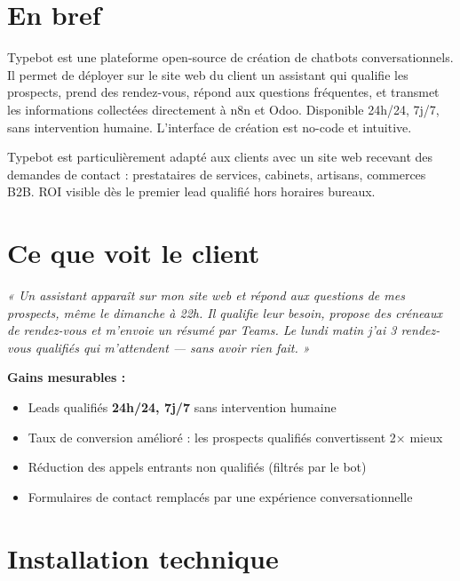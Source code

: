 \documentclass[11pt, a4paper]{article}
\begin{document}
\ficheHeader

\section*{En bref}
Typebot est une plateforme open-source de création de chatbots conversationnels. Il permet de déployer sur le site web du client un assistant qui qualifie les prospects, prend des rendez-vous, répond aux questions fréquentes, et transmet les informations collectées directement à n8n et Odoo. Disponible 24h/24, 7j/7, sans intervention humaine. L'interface de création est no-code et intuitive.

\begin{pointcle}
  Typebot est particulièrement adapté aux clients avec un site web recevant des demandes de contact : prestataires de services, cabinets, artisans, commerces B2B. ROI visible dès le premier lead qualifié hors horaires bureaux.
\end{pointcle}

\section{Ce que voit le client}

\begin{clientbox}
  \textit{« Un assistant apparaît sur mon site web et répond aux questions de mes prospects, même le dimanche à 22h. Il qualifie leur besoin, propose des créneaux de rendez-vous et m'envoie un résumé par Teams. Le lundi matin j'ai 3 rendez-vous qualifiés qui m'attendent — sans avoir rien fait. »}
\end{clientbox}

\textbf{Gains mesurables :}
\begin{itemize}
  \item Leads qualifiés \textbf{24h/24, 7j/7} sans intervention humaine
  \item Taux de conversion amélioré : les prospects qualifiés convertissent 2× mieux
  \item Réduction des appels entrants non qualifiés (filtrés par le bot)
  \item Formulaires de contact remplacés par une expérience conversationnelle
\end{itemize}

\section{Installation technique}
\end{document}
